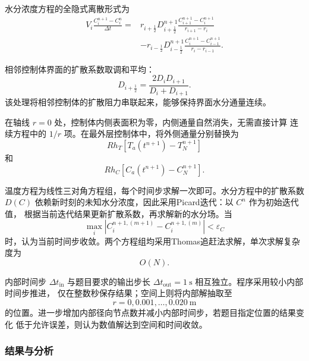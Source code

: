 \documentclass[12pt,a4paper]{article}
\begin{document}
水分浓度方程的全隐式离散形式为
\begin{equation}
\begin{aligned}
V_i\frac{C_i^{n+1}-C_i^n}{\Delta t}
={}&r_{i+\frac12}D_{i+\frac12}^{n+1}
\frac{C_{i+1}^{n+1}-C_i^{n+1}}{r_{i+1}-r_i}\\
&-r_{i-\frac12}D_{i-\frac12}^{n+1}
\frac{C_i^{n+1}-C_{i-1}^{n+1}}{r_i-r_{i-1}}.
\end{aligned}
\label{eq:merged-q1-moisture-fvm}
\end{equation}

相邻控制体界面的扩散系数取调和平均：
\begin{equation}
D_{i+\frac12}=\frac{2D_iD_{i+1}}{D_i+D_{i+1}}.
\label{eq:merged-q1-harmonic}
\end{equation}
该处理将相邻控制体的扩散阻力串联起来，能够保持界面水分通量连续。

在轴线 $r=0$ 处，控制体内侧表面积为零，内侧通量自然消失，无需直接计算
连续方程中的 $1/r$ 项。在最外层控制体中，将外侧通量分别替换为
\begin{equation}
Rh_T\left[T_a(t^{n+1})-T_N^{n+1}\right]
\end{equation}
和
\begin{equation}
Rh_C\left[C_a(t^{n+1})-C_N^{n+1}\right].
\end{equation}

温度方程为线性三对角方程组，每个时间步求解一次即可。水分方程中的扩散系数
$D(C)$ 依赖新时刻的未知水分浓度，因此采用Picard迭代：以 $C^n$ 作为初始迭代值，
根据当前迭代结果更新扩散系数，再求解新的水分场。当
\begin{equation}
\max_i\left|C_i^{n+1,(m+1)}-C_i^{n+1,(m)}\right|<\varepsilon_C
\end{equation}
时，认为当前时间步收敛。两个方程组均采用Thomas追赶法求解，单次求解复杂度为
\begin{equation}
O(N).
\end{equation}

内部时间步 $\Delta t_{\mathrm{in}}$ 与题目要求的输出步长
$\Delta t_{\mathrm{out}}=1\ \mathrm{s}$ 相互独立。程序采用较小内部时间步推进，
仅在整数秒保存结果；空间上则将内部解抽取至
\begin{equation}
r=0,0.001,\ldots,0.020\ \mathrm{m}
\end{equation}
的位置。进一步增加内部径向节点数并减小内部时间步，若题目指定位置的结果变化
低于允许误差，则认为数值解达到空间和时间收敛。

\subsubsection{结果与分析}
\end{document}
